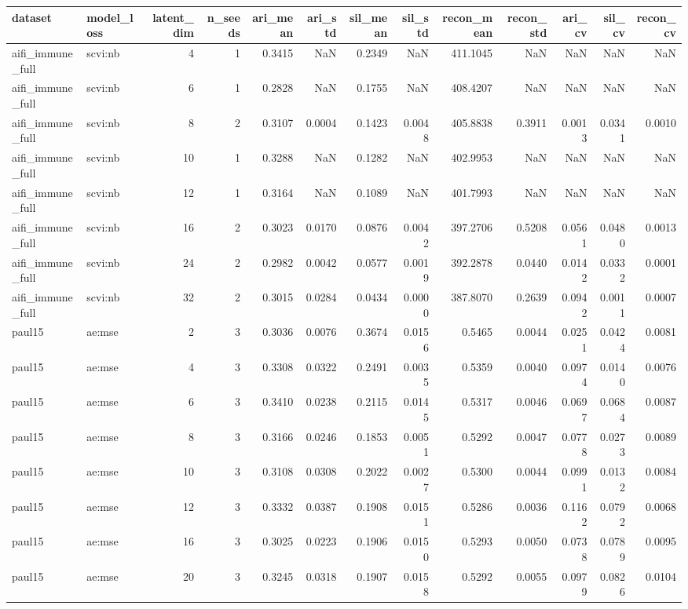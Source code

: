 \begin{tabular}{llrrrrrrrrrrr}
\toprule
dataset & model\_loss & latent\_dim & n\_seeds & ari\_mean & ari\_std & sil\_mean & sil\_std & recon\_mean & recon\_std & ari\_cv & sil\_cv & recon\_cv \\
\midrule
aifi\_immune\_full & scvi:nb & 4 & 1 & 0.3415 & NaN & 0.2349 & NaN & 411.1045 & NaN & NaN & NaN & NaN \\
aifi\_immune\_full & scvi:nb & 6 & 1 & 0.2828 & NaN & 0.1755 & NaN & 408.4207 & NaN & NaN & NaN & NaN \\
aifi\_immune\_full & scvi:nb & 8 & 2 & 0.3107 & 0.0004 & 0.1423 & 0.0048 & 405.8838 & 0.3911 & 0.0013 & 0.0341 & 0.0010 \\
aifi\_immune\_full & scvi:nb & 10 & 1 & 0.3288 & NaN & 0.1282 & NaN & 402.9953 & NaN & NaN & NaN & NaN \\
aifi\_immune\_full & scvi:nb & 12 & 1 & 0.3164 & NaN & 0.1089 & NaN & 401.7993 & NaN & NaN & NaN & NaN \\
aifi\_immune\_full & scvi:nb & 16 & 2 & 0.3023 & 0.0170 & 0.0876 & 0.0042 & 397.2706 & 0.5208 & 0.0561 & 0.0480 & 0.0013 \\
aifi\_immune\_full & scvi:nb & 24 & 2 & 0.2982 & 0.0042 & 0.0577 & 0.0019 & 392.2878 & 0.0440 & 0.0142 & 0.0332 & 0.0001 \\
aifi\_immune\_full & scvi:nb & 32 & 2 & 0.3015 & 0.0284 & 0.0434 & 0.0000 & 387.8070 & 0.2639 & 0.0942 & 0.0011 & 0.0007 \\
paul15 & ae:mse & 2 & 3 & 0.3036 & 0.0076 & 0.3674 & 0.0156 & 0.5465 & 0.0044 & 0.0251 & 0.0424 & 0.0081 \\
paul15 & ae:mse & 4 & 3 & 0.3308 & 0.0322 & 0.2491 & 0.0035 & 0.5359 & 0.0040 & 0.0974 & 0.0140 & 0.0076 \\
paul15 & ae:mse & 6 & 3 & 0.3410 & 0.0238 & 0.2115 & 0.0145 & 0.5317 & 0.0046 & 0.0697 & 0.0684 & 0.0087 \\
paul15 & ae:mse & 8 & 3 & 0.3166 & 0.0246 & 0.1853 & 0.0051 & 0.5292 & 0.0047 & 0.0778 & 0.0273 & 0.0089 \\
paul15 & ae:mse & 10 & 3 & 0.3108 & 0.0308 & 0.2022 & 0.0027 & 0.5300 & 0.0044 & 0.0991 & 0.0132 & 0.0084 \\
paul15 & ae:mse & 12 & 3 & 0.3332 & 0.0387 & 0.1908 & 0.0151 & 0.5286 & 0.0036 & 0.1162 & 0.0792 & 0.0068 \\
paul15 & ae:mse & 16 & 3 & 0.3025 & 0.0223 & 0.1906 & 0.0150 & 0.5293 & 0.0050 & 0.0738 & 0.0789 & 0.0095 \\
paul15 & ae:mse & 20 & 3 & 0.3245 & 0.0318 & 0.1907 & 0.0158 & 0.5292 & 0.0055 & 0.0979 & 0.0826 & 0.0104 \\

\end{tabular}
